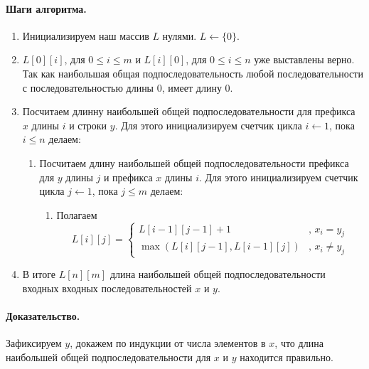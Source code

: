 \documentclass[12pt]{article}
\begin{document}
\paragraph{Шаги алгоритма.}
\begin{enumerate}
    \item Инициализируем наш массив $ L $ нулями. $ L \leftarrow \{0\} $.

    \item $ L[0][i] $, для $ 0 \le i \le m $ и $ L[i][0] $, для $ 0 \le i \le n $ 
    уже выставлены верно. Так как наибольшая общая подпоследовательность любой
    последовательности с последовательностью длины 0, имеет длину 0.

    \item Посчитаем длинну наибольшей общей подпоследовательности для префикса $ x $
    длины $ i $ и строки $ y $. Для этого инициализируем счетчик цикла 
    $ i \leftarrow 1 $, пока $ i \le n $ делаем:
    \begin{enumerate}
        \item Посчитаем длину наибольшей общей подпоследовательности префикса для 
        $ y $ длины $ j $ и префикса $ x $ длины $ i $. Для этого инициализируем
        счетчик цикла $ j \leftarrow 1 $, пока $ j \le m $ делаем:
        \begin{enumerate}
            \item Полагаем 
            $$ L[i][j] = \left\{ 
                \begin{array}{ll}
                    L[i - 1][j - 1] + 1 &\mbox{, } x_i = y_j \\
                    \max(L[i][j - 1], L[i - 1][j]) &\mbox{, } x_i \ne y_j
                \end{array}
            \right.$$
        \end{enumerate}
    \end{enumerate}

    \item В итоге $ L[n][m] $ длина наибольшей общей подпоследовательности входных
    входных последовательностей $ x $ и $ y $.
\end{enumerate}


\paragraph{Доказательство.}
Зафиксируем $ y $, докажем по индукции от числа элементов в $ x $, что длина
наибольшей общей подпоследовательности для $ x $ и $ y $ находится правильно.
\end{document}
